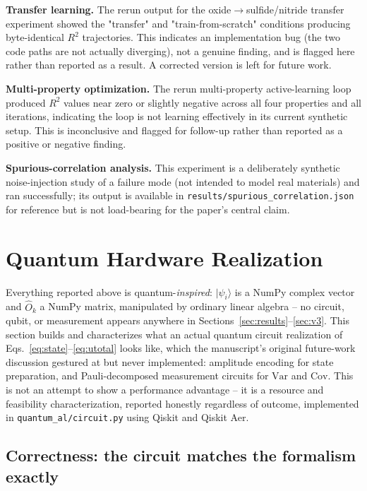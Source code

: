 \documentclass[conference]{IEEEtran}
\begin{document}
\textbf{Transfer learning.} The rerun output for the oxide$\to$sulfide/nitride transfer experiment showed the "transfer" and "train-from-scratch" conditions producing byte-identical $R^2$ trajectories. This indicates an implementation bug (the two code paths are not actually diverging), not a genuine finding, and is flagged here rather than reported as a result. A corrected version is left for future work.

\textbf{Multi-property optimization.} The rerun multi-property active-learning loop produced $R^2$ values near zero or slightly negative across all four properties and all iterations, indicating the loop is not learning effectively in its current synthetic setup. This is inconclusive and flagged for follow-up rather than reported as a positive or negative finding.

\textbf{Spurious-correlation analysis.} This experiment is a deliberately synthetic noise-injection study of a failure mode (not intended to model real materials) and ran successfully; its output is available in \texttt{results/spurious\_correlation.json} for reference but is not load-bearing for the paper's central claim.

\section{Quantum Hardware Realization}\label{sec:hardware}

Everything reported above is quantum-\emph{inspired}: $|\psi_i\rangle$ is a NumPy complex vector and $\hat{O}_k$ a NumPy matrix, manipulated by ordinary linear algebra -- no circuit, qubit, or measurement appears anywhere in Sections~\ref{sec:results}--\ref{sec:v3}. This section builds and characterizes what an actual quantum circuit realization of Eqs.~\eqref{eq:state}--\eqref{eq:utotal} looks like, which the manuscript's original future-work discussion gestured at but never implemented: amplitude encoding for state preparation, and Pauli-decomposed measurement circuits for $\mathrm{Var}$ and $\mathrm{Cov}$. This is not an attempt to show a performance advantage -- it is a resource and feasibility characterization, reported honestly regardless of outcome, implemented in \texttt{quantum\_al/circuit.py} using Qiskit and Qiskit Aer.

\subsection{Correctness: the circuit matches the formalism exactly}
\end{document}
